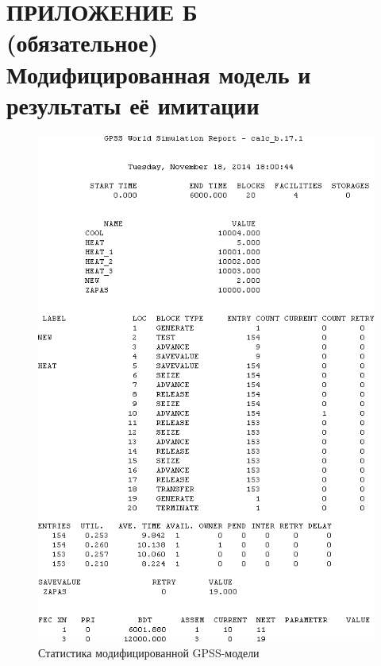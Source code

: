\section*{ПРИЛОЖЕНИЕ Б \\
  (обязательное) \\ 
  Модифицированная модель и результаты её имитации}
\label{sec:appendix_b}

\pagestyle{fancy}
\fancyhf{}  %
\fancyfoot[R]{\thepage}
\renewcommand{\headrulewidth}{0pt}
\renewcommand{\footrulewidth}{0pt}

\setlength{\headheight}{10mm}
\setlength{\headsep}{\baselineskip}

\thispagestyle{plain}

\setcounter{section}{2}
\setcounter{figure}{0}
\setcounter{table}{0}
\setcounter{lstlisting}{0}



\begin{figure}[h!]
  \centering
  \includegraphics[width=150mm]{pic/modified_report}
  \caption{Статистика модифицированной GPSS-модели}
  \label{pic:modified_report}
\end{figure}
